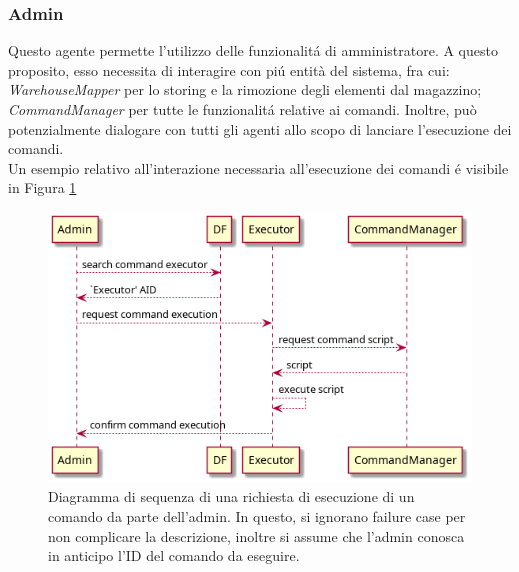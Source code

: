 \subsubsection{Admin}
Questo agente permette l'utilizzo delle funzionalit\'a di amministratore. A questo proposito, esso necessita di interagire con pi\'u entità del sistema, fra cui: \textit{WarehouseMapper} per lo storing e la rimozione degli elementi dal magazzino; \textit{CommandManager} per tutte le funzionalit\'a relative ai comandi. Inoltre, può potenzialmente dialogare con tutti gli agenti allo scopo di lanciare l'esecuzione dei comandi.\\
Un esempio relativo all'interazione necessaria all'esecuzione dei comandi \'e visibile in Figura \ref{fig:command_execution-sequence_diagram}
\begin{figure}[!ht]\centering
    \includegraphics[width=\textwidth]{section/design/figure/command_execution-sequence_diagram.png}
    \caption{Diagramma di sequenza di una richiesta di esecuzione di un comando da parte dell'admin. In questo, si ignorano failure case per non complicare la descrizione, inoltre si assume che l'admin conosca in anticipo l'ID del comando da eseguire.}
    \label{fig:command_execution-sequence_diagram}
\end{figure}

